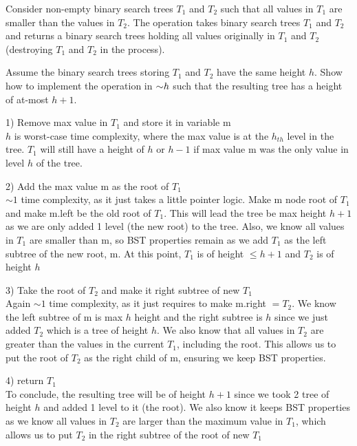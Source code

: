\begin{problem}
Consider non-empty binary search trees $T_1$ and $T_2$ such that all values in $T_1$ are smaller than the values in $T_2$. The  operation takes binary search trees $T_1$ and $T_2$ and returns a binary search trees holding all values originally in $T_1$ and $T_2$ (destroying $T_1$ and $T_2$ in the process). 
\begin{questions}
\item Assume the binary search trees storing $T_1$ and $T_2$ have the same height $h$. Show how to implement the  operation in $\mathord{\sim}h$ such that the resulting tree has a height of at-most $h+1$.

1) Remove max value in $T_1$ and store it in variable m\\
$h$ is worst-case time complexity, where the max value is at the $h_{th}$ level in the tree. $T_1$ will still have a height of $h$ or $h-1$ if max value m was the only value in level $h$ of the tree.

2) Add the max value m as the root of $T_1$\\
$\sim 1$ time complexity, as it just takes a little pointer logic. Make m node root of $T_1$ and make m.left be the old root of $T_1$. This will lead the tree be max height $h+1$ as we are only added 1 level (the new root) to the tree.
Also, we know all values in $T_1$ are smaller than m, so BST properties remain as we add $T_1$ as the left subtree of the new root, m.
At this point, $T_1$ is of height $ \leq h+1$ and $T_2$ is of height $h$

3) Take the root of $T_2$ and make it right subtree of new $T_1$\\
Again $\sim 1$ time complexity, as it just requires to make m.right $ = T_2$. We know the left subtree of m is max $h$ height and the right subtree is $h$ since we just added $T_2$ which is a tree of height $h$.
We also know that all values in $T_2$ are greater than the values in the current $T_1$, including the root. This allows us to put the root of $T_2$ as the right child of m, ensuring we keep BST properties.

4) return $T_1$\\

To conclude, the resulting tree will be of height $h+1$ since we took 2 tree of height $h$ and added 1 level to it (the root). We also know it keeps BST properties as we know all values in $T_2$ are larger than the maximum value in $T_1$, which allows us to put $T_2$ in the right subtree of the root of new $T_1$


\end{questions}
\end{problem}
